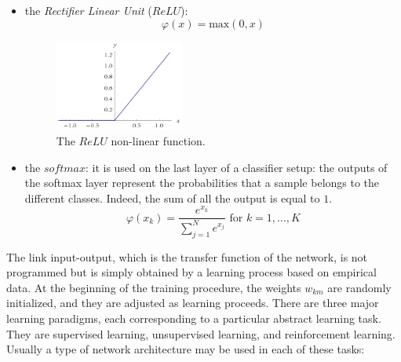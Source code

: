 \begin{itemize}
\item the \textit{ Rectifier Linear Unit} ($ReLU$):
\begin{equation}
\varphi(x) = \text{max}(0,x)
\end{equation}
\begin{figure}[h!]
\centering
	\includegraphics[width=0.4\textwidth]{img/relu}
	\caption{The $ReLU$ non-linear function.}
\end{figure}

\item the $softmax$: it is used on the last layer of a classifier setup: the outputs of the softmax layer represent the probabilities that a sample belongs to the different classes. Indeed, the sum of all the output is equal to $1$.
\begin{equation}
\varphi(x_k) = \frac{e^{x_k}}{\sum_{j=1}^{N}e^{x_j}} \text{ for }  k=1,\dots,K
\end{equation}
\end{itemize}

The link input-output, which is the transfer function of the network, is not programmed but is simply obtained by a learning process based on empirical data. At the beginning of the training procedure, the weights ${ w }_{ km }$ are randomly initialized, and they are adjusted as learning proceeds. 
There are three major learning paradigms, each corresponding to a particular abstract learning task.
They are supervised learning, unsupervised learning, and reinforcement learning. Usually a type of
network architecture may be used in each of these tasks:

